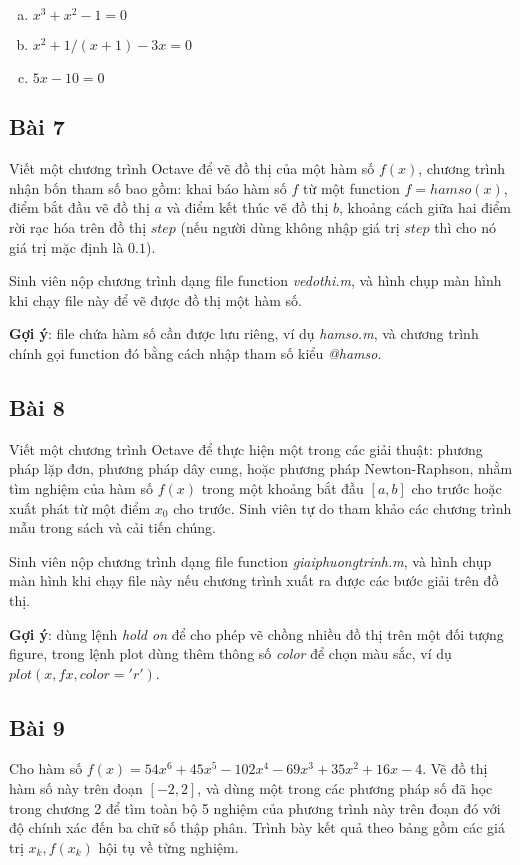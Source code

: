 \documentclass[12pt]{article}
\begin{document}
\begin{enumerate}[a)]

\item $x^3 + x^2 - 1 = 0$

\item $x^2 + 1/(x+1) - 3x = 0$

\item $5x - 10 = 0$

\end{enumerate}

\subsection{Bài 7}
Viết một chương trình Octave để vẽ đồ thị của một hàm số $f(x)$, chương trình nhận bốn tham số bao gồm: khai báo hàm số $f$ từ một function $f=hamso(x)$, điểm bắt đầu vẽ đồ thị $a$ và điểm kết thúc vẽ đồ thị $b$, khoảng cách giữa hai điểm rời rạc hóa trên đồ thị $step$ (nếu người dùng không nhập giá trị $step$ thì cho nó giá trị mặc định là $0.1$).

Sinh viên nộp chương trình dạng file function \emph{vedothi.m}, và hình chụp màn hình khi chạy file này để vẽ được đồ thị một hàm số.

\textbf{Gợi ý}: file chứa hàm số cần được lưu riêng, ví dụ \emph{hamso.m}, và chương trình chính gọi function đó bằng cách nhập tham số kiểu \emph{@hamso}.

\subsection{Bài 8}
Viết một chương trình Octave để thực hiện một trong các giải thuật: phương pháp lặp đơn, phương pháp dây cung, hoặc phương pháp Newton-Raphson, nhằm tìm nghiệm của hàm số $f(x)$ trong một khoảng bắt đầu $[a,b]$ cho trước hoặc xuất phát từ một điểm $x_0$ cho trước. Sinh viên tự do tham khảo các chương trình mẫu trong sách và cải tiến chúng.

Sinh viên nộp chương trình dạng file function \emph{giaiphuongtrinh.m}, và hình chụp màn hình khi chạy file này nếu chương trình xuất ra được các bước giải trên đồ thị.

\textbf{Gợi ý}: dùng lệnh \emph{hold on} để cho phép vẽ chồng nhiều đồ thị trên một đối tượng figure, trong lệnh plot dùng thêm thông số \emph{color} để chọn màu sắc, ví dụ $plot(x,fx,color='r')$.

\subsection{Bài 9}
Cho hàm số $f(x) = 54x^6 + 45x^5 - 102x^4 - 69x^3 + 35x^2 + 16x -4$. Vẽ đồ thị hàm số này trên đoạn $[-2,2]$, và dùng một trong các phương pháp số đã học trong chương 2 để tìm toàn bộ 5 nghiệm của phương trình này trên đoạn đó với độ chính xác đến ba chữ số thập phân. Trình bày kết quả theo bảng gồm các giá trị $x_k, f(x_k)$ hội tụ về từng nghiệm.
\end{document}
